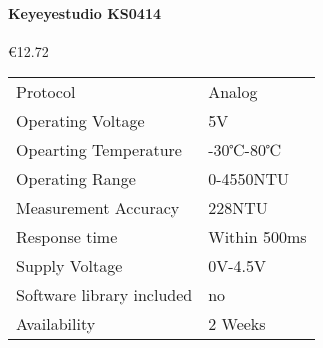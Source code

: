 \paragraph{Keyeyestudio KS0414}\mbox{€12.72} \cite{KS0414}
\begin{table}[h!]
	\centering
	\quad
	\begin{tabular}{| l | l |}
    \hline
    Protocol & Analog\\
    Operating Voltage & 5V\\
    Opearting Temperature & -30℃-80℃\\
    Operating Range & 0-4550NTU\\
    Measurement Accuracy & 228NTU\\
    Response time & Within 500ms \\
    Supply Voltage & 0V-4.5V \\
    Software library included & no \\
    Availability & 2 Weeks \\
    \hline
	\end{tabular}
\end{table}

